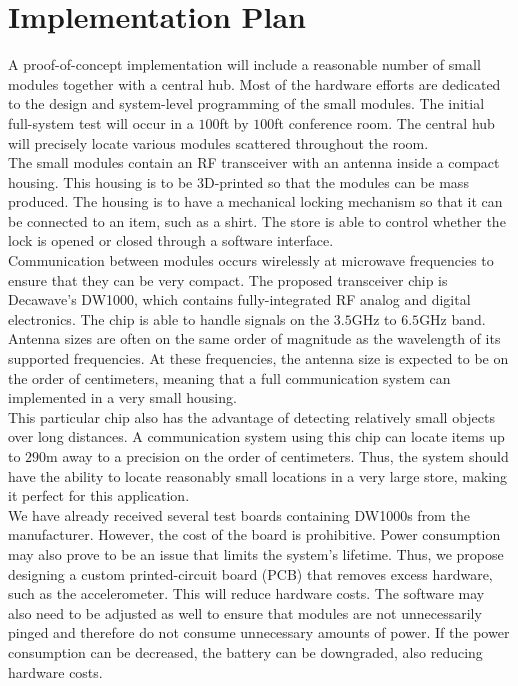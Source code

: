 \documentclass{article}
\begin{document}
\section{Implementation Plan}
A proof-of-concept implementation will include a reasonable number of small modules together with a central hub.
Most of the hardware efforts are dedicated to the design and system-level programming of the small modules.
The initial full-system test will occur in a $100$ft by $100$ft conference room.
The central hub will precisely locate various modules scattered throughout the room. \\

The small modules contain an RF transceiver with an antenna inside a compact housing.
This housing is to be 3D-printed so that the modules can be mass produced.
The housing is to have a mechanical locking mechanism so that it can be connected to an item, such as a shirt.
The store is able to control whether the lock is opened or closed through a software interface. \\

Communication between modules occurs wirelessly at microwave frequencies to ensure that they can be very compact.
The proposed transceiver chip is Decawave's DW1000, which contains fully-integrated RF analog and digital electronics.
The chip is able to handle signals on the $3.5$\si{\giga\hertz} to $6.5$\si{\giga\hertz} band.
Antenna sizes are often on the same order of magnitude as the wavelength of its supported frequencies.
At these frequencies, the antenna size is expected to be on the order of centimeters, meaning that a full communication system can implemented in a very small housing. \\

This particular chip also has the advantage of detecting relatively small objects over long distances.
A communication system using this chip can locate items up to $290$\si{\meter} away to a precision on the order of centimeters.
Thus, the system should have the ability to locate reasonably small locations in a very large store, making it perfect for this application. \\

We have already received several test boards containing DW1000s from the manufacturer.
However, the cost of the board is prohibitive.
Power consumption may also prove to be an issue that limits the system's lifetime.
Thus, we propose designing a custom printed-circuit board (PCB) that removes excess hardware, such as the accelerometer.
This will reduce hardware costs.
The software may also need to be adjusted as well to ensure that modules are not unnecessarily pinged and therefore do not consume unnecessary amounts of power.
If the power consumption can be decreased, the battery can be downgraded, also reducing hardware costs. \\
\end{document}
